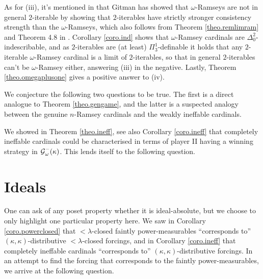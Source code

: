 \documentclass[../../main]{subfiles}
\begin{document}
\qquad As for (iii), it's mentioned in \cite{HolySchlicht} that Gitman has showed that $\omega$-Ramseys are not in general $2$-iterable by showing that $2$-iterables have strictly stronger consistency strength than the $\omega$-Ramseys, which also follows from Theorem \ref{theo.remlimram} and Theorem 4.8 in \cite{Ramsey2}. Corollary \ref{coro.ind} shows that $\omega$-Ramsey cardinals are $\Delta^2_0$-indescribable, and as $2$-iterables are (at least) $\Pi^1_3$-definable it holds that any $2$-iterable $\omega$-Ramsey cardinal is a limit of $2$-iterables, so that in general $2$-iterables can't be $\omega$-Ramsey either, answering (iii) in the negative. Lastly, Theorem \ref{theo.omegaplusone} gives a positive answer to (iv).

\qquad We conjecture the following two questions to be true. The first is a direct analogue to Theorem \ref{theo.gengame}, and the latter is a suspected analogy between the genuine $n$-Ramsey cardinals and the weakly ineffable cardinals.



We showed in Theorem \ref{theo.ineff}, see also Corollary \ref{coro.ineff} that completely ineffable cardinals could be characterised in terms of player II having a winning strategy in $\operatorname{\mathcal G}_\omega^-(\kappa)$. This lends itself to the following question.



\section{Ideals}

One can ask of any poset property whether it is ideal-absolute, but we choose to only highlight one particular property here. We saw in Corollary \ref{coro.powerclosed} that ${<}\lambda$-closed faintly power-measurables ``corresponds to'' $(\kappa,\kappa)$-distributive ${<}\lambda$-closed forcings, and in Corollary \ref{coro.ineff} that completely ineffable cardinals ``corresponds to'' $(\kappa,\kappa)$-distributive forcings. In an attempt to find the forcing that corresponds to the faintly power-measurables, we arrive at the following question.
\end{document}
